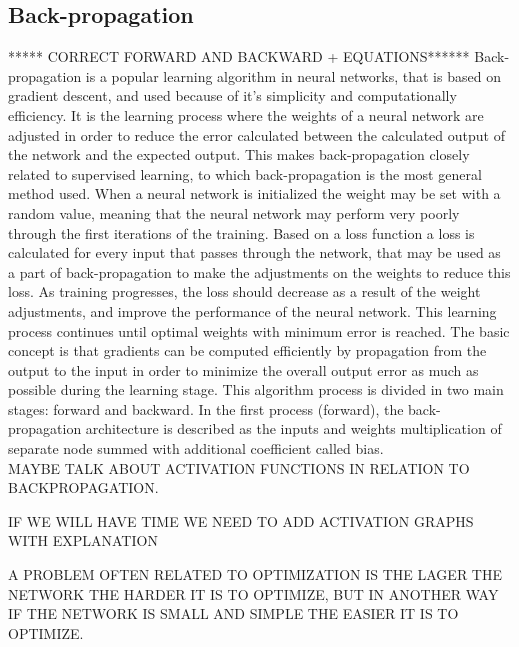   
\subsection{Back-propagation}
***** CORRECT FORWARD AND BACKWARD + EQUATIONS******
Back-propagation is a popular learning algorithm in neural networks, that is based on gradient descent, and used because of it's simplicity and computationally efficiency.\citep{Bengio2012, Duda2000} It is the learning process where the weights of a neural network are adjusted in order to reduce the error calculated between the calculated output of the network and the expected output. This makes back-propagation closely related to supervised learning, to which back-propagation is the most general method used.\citep{Duda2000}  
When a neural network is initialized the weight may be set with a random value, meaning that the neural network may perform very poorly through the first iterations of the training. Based on a loss function a loss is calculated for every input that passes through the network, that may be used as a part of back-propagation to make the adjustments on the weights to reduce this loss. As training progresses, the loss should decrease as a result of the weight adjustments, and improve the performance of the neural network.\citep{LeCun2015, Goodfellow2016, Duda2000}   
This learning process continues until optimal weights with minimum error is reached.\citep{Hameed2016}
\noindent
The basic concept is that gradients can be computed efficiently by propagation from the output to the input in order to minimize the overall output error as much as possible during the learning stage. This algorithm process is divided in two main stages: forward and backward. In the first process (forward), the back-propagation architecture is described as the inputs and weights multiplication of separate node summed with additional coefficient called bias.\citep{Hameed2016,LeCun1998} \\

MAYBE TALK ABOUT ACTIVATION FUNCTIONS IN RELATION TO BACKPROPAGATION. 

IF WE WILL HAVE TIME WE NEED TO ADD ACTIVATION GRAPHS WITH EXPLANATION

A PROBLEM OFTEN RELATED TO OPTIMIZATION IS THE LAGER THE NETWORK THE HARDER IT IS TO OPTIMIZE, BUT IN ANOTHER WAY IF THE NETWORK IS SMALL AND SIMPLE THE EASIER IT IS TO OPTIMIZE. 


